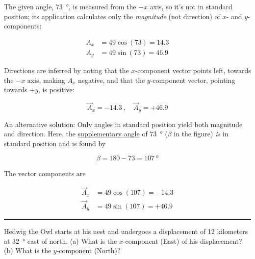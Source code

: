 \documentclass[main.tex]{subfiles}
\begin{document}
The given angle, \SI{73}{\degree}, is measured from the $-x$ axis, so it's not in standard position; its application calculates only the \textit{magnitude} (not direction) of $x$- and $y$-components: 


\begin{align*}
    A_x &= 49 \cos{(73)} = 14.3\\[1ex]
    A_y &= 49 \sin{(73)} = 46.9
\end{align*}


Directions are inferred by noting that the $x$-component vector points left, towards the $-x$ axis, making $A_x$ negative, and that the $y$-component vector, pointing towards $+y$, is positive:

\begin{equation*}
    \vec{A}_x = -14.3\ , \hspace{1em}
    \vec{A}_y = +46.9
\end{equation*}

An alternative solution: Only angles in standard position yield both magnitude and direction. Here, the \href{https://mathworld.wolfram.com/SupplementaryAngles.html}{supplementary angle} of \SI{73}{\degree} ($\beta$ in the figure) \textit{is} in standard position and is found by

\begin{equation*}
    \beta = 180 - 73 = \SI{107}{\degree}
\end{equation*}

The vector components are

\begin{align*}
    \vec{A}_x &= 49 \cos{(107)} = -14.3\\[1ex]
    \vec{A}_y &= 49 \sin{(107)} = +46.9
\end{align*}

\hrule

\begin{example}
    Hedwig the Owl starts at his nest and undergoes a displacement of 12 kilometers at \SI{32}{\degree} east of north. (a) What is the $x$-component (East) of his displacement? (b) What is the $y$-component (North)?
\end{example}

\Solution
\end{document}
